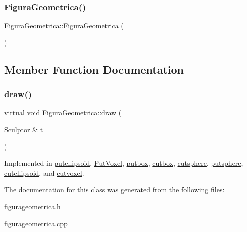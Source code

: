 \subsubsection{\texorpdfstring{FiguraGeometrica()}{FiguraGeometrica()}}
{\footnotesize\ttfamily Figura\+Geometrica\+::\+Figura\+Geometrica (\begin{DoxyParamCaption}{ }\end{DoxyParamCaption})}



\subsection{Member Function Documentation}
\mbox{\label{class_figura_geometrica_a34585fd7c0bd7378fc69c4ee208e676c}} 
\subsubsection{\texorpdfstring{draw()}{draw()}}
{\footnotesize\ttfamily virtual void Figura\+Geometrica\+::draw (\begin{DoxyParamCaption}\item[{\mbox{\hyperlink{class_sculptor}{Sculptor}} \&}]{t }\end{DoxyParamCaption})\hspace{0.3cm}{\ttfamily [pure virtual]}}



Implemented in \mbox{\hyperlink{classputellipsoid_a716adca21bdfef33cf3a44b89361a29a}{putellipsoid}}, \mbox{\hyperlink{class_put_voxel_af784ab77d8a7aac2010e608796710ccb}{Put\+Voxel}}, \mbox{\hyperlink{classputbox_a1c330a31b906efd7b0fcfa0efb6f06ef}{putbox}}, \mbox{\hyperlink{classcutbox_a4ba67b689b29c977d4162109bf2f929b}{cutbox}}, \mbox{\hyperlink{classcutsphere_a7dbeb4df030b362a0d11a758978dd37d}{cutsphere}}, \mbox{\hyperlink{classputsphere_afb72d04545c9a049d82d6faa5cb18954}{putsphere}}, \mbox{\hyperlink{classcutellipsoid_a932dbc381691f5b42c7062c6699c7867}{cutellipsoid}}, and \mbox{\hyperlink{classcutvoxel_a6ef7e4acd616477fe3b07b08b7899d23}{cutvoxel}}.



The documentation for this class was generated from the following files\+:\begin{DoxyCompactItemize}
\item 
\mbox{\hyperlink{figurageometrica_8h}{figurageometrica.\+h}}\item 
\mbox{\hyperlink{figurageometrica_8cpp}{figurageometrica.\+cpp}}\end{DoxyCompactItemize}
